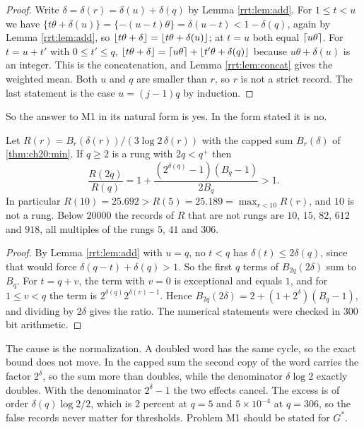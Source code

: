 \begin{proof}
Write $\delta=\delta(r)=\delta(u)+\delta(q)$ by Lemma \ref{rrt:lem:add}. For $1\le t<u$ we have $\{t\theta+\delta(u)\}=\{-(u-t)\theta\}=\delta(u-t)<1-\delta(q)$, again by Lemma \ref{rrt:lem:add}, so $\lfloor t\theta+\delta\rfloor=\lfloor t\theta+\delta(u)\rfloor$; at $t=u$ both equal $\lceil u\theta\rceil$. For $t=u+t'$ with $0\le t'\le q$, $\lfloor t\theta+\delta\rfloor=\lceil u\theta\rceil+\lfloor t'\theta+\delta(q)\rfloor$ because $u\theta+\delta(u)$ is an integer. This is the concatenation, and Lemma \ref{rrt:lem:concat} gives the weighted mean. Both $u$ and $q$ are smaller than $r$, so $r$ is not a strict record. The last statement is the case $u=(j-1)q$ by induction.
\end{proof}

So the answer to M1 in its natural form is yes. In the form stated it is no.

\begin{proposition}\label{rrt:prop:false}
Let $R(r)=B_r(\delta(r))/(3\log 2\,\delta(r))$ with the capped sum $B_r(\delta)$ of \cref{thm:ch20:min}. If $q\ge 2$ is a rung with $2q<q^+$ then
\[
\frac{R(2q)}{R(q)}=1+\frac{(2^{\delta(q)}-1)(B_q-1)}{2B_q}>1 .
\]
In particular $R(10)=25.692>R(5)=25.189=\max_{r<10}R(r)$, and $10$ is not a rung. Below $20000$ the records of $R$ that are not rungs are $10$, $15$, $82$, $612$ and $918$, all multiples of the rungs $5$, $41$ and $306$.
\end{proposition}

\begin{proof}
By Lemma \ref{rrt:lem:add} with $u=q$, no $t<q$ has $\delta(t)\le 2\delta(q)$, since that would force $\delta(q-t)+\delta(q)>1$. So the first $q$ terms of $B_{2q}(2\delta)$ sum to $B_q$. For $t=q+v$, the term with $v=0$ is exceptional and equals $1$, and for $1\le v<q$ the term is $2^{\delta(q)}2^{\delta(v)-1}$. Hence $B_{2q}(2\delta)=2+(1+2^{\delta})(B_q-1)$, and dividing by $2\delta$ gives the ratio. The numerical statements were checked in $300$ bit arithmetic.
\end{proof}

The cause is the normalization. A doubled word has the same cycle, so the exact bound does not move. In the capped sum the second copy of the word carries the factor $2^{\delta}$, so the sum more than doubles, while the denominator $\delta\log 2$ exactly doubles. With the denominator $2^{\delta}-1$ the two effects cancel. The excess is of order $\delta(q)\log 2/2$, which is $2$ percent at $q=5$ and $5\times10^{-4}$ at $q=306$, so the false records never matter for thresholds. Problem M1 should be stated for $G^*$.


